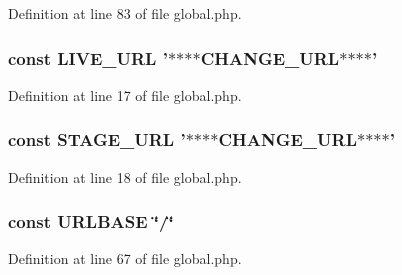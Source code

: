 Definition at line 83 of file global.\-php.

\hypertarget{global_8php_ade7436eeb9a94e391a9d15a8a6865dd9}{
\subsubsection[{L\-I\-V\-E\-\_\-\-U\-R\-L}]{\setlength{\rightskip}{0pt plus 5cm}const L\-I\-V\-E\-\_\-\-U\-R\-L '$\ast$$\ast$$\ast$$\ast$C\-H\-A\-N\-G\-E\-\_\-\-U\-R\-L$\ast$$\ast$$\ast$$\ast$'}}\label{global_8php_ade7436eeb9a94e391a9d15a8a6865dd9}


Definition at line 17 of file global.\-php.

\hypertarget{global_8php_a9de38c82260effe90ef1caa4d6026973}{
\subsubsection[{S\-T\-A\-G\-E\-\_\-\-U\-R\-L}]{\setlength{\rightskip}{0pt plus 5cm}const S\-T\-A\-G\-E\-\_\-\-U\-R\-L '$\ast$$\ast$$\ast$$\ast$C\-H\-A\-N\-G\-E\-\_\-\-U\-R\-L$\ast$$\ast$$\ast$$\ast$'}}\label{global_8php_a9de38c82260effe90ef1caa4d6026973}


Definition at line 18 of file global.\-php.

\hypertarget{global_8php_a422353d788747ecd47fc7a656e4ebd92}{
\subsubsection[{U\-R\-L\-B\-A\-S\-E}]{\setlength{\rightskip}{0pt plus 5cm}const U\-R\-L\-B\-A\-S\-E \char`\"{}/\char`\"{}}}\label{global_8php_a422353d788747ecd47fc7a656e4ebd92}


Definition at line 67 of file global.\-php.

